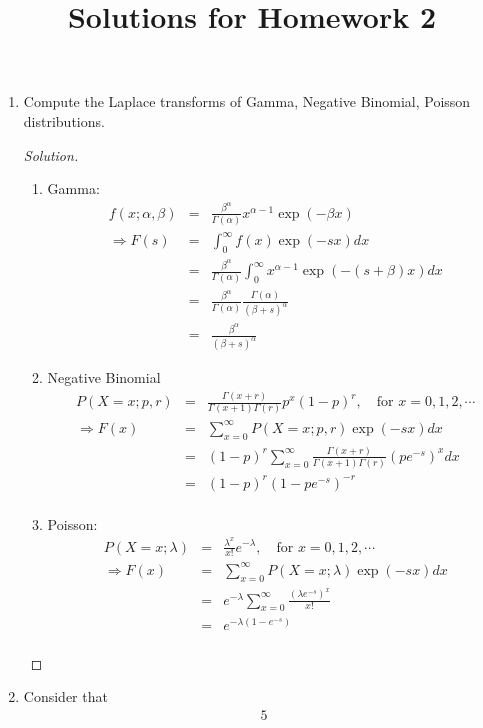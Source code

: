 \documentclass[10pt,a4paper]{article}
\title{Solutions for Homework 2}
\date{}
\begin{document}
\maketitle
\begin{enumerate}
\item Compute the Laplace transforms of Gamma, Negative Binomial, Poisson distributions.
\begin{proof}[Solution]\let\qed\relax
\begin{enumerate}
\item Gamma:
\begin{eqnarray*}
f(x; \alpha,\beta) &=& \frac{\beta^\alpha}{\Gamma(\alpha)}x^{\alpha-1}\exp(-\beta x) \\
\Longrightarrow F(s) &=& \int_0^\infty f(x)\exp(-s x) dx \\
&=& \frac{\beta^\alpha}{\Gamma(\alpha)}\int_0^\infty x^{\alpha-1}\exp(-(s+\beta)x) dx \\
&=& \frac{\beta^\alpha}{\Gamma(\alpha)}\frac{\Gamma(\alpha)}{(\beta+s)^\alpha} \\
&=& \frac{\beta^\alpha}{(\beta+s)^\alpha}
\end{eqnarray*}
\item Negative Binomial
\begin{eqnarray*}
P(X=x;p,r) &=& \frac{\Gamma(x+r)}{\Gamma(x+1)\Gamma(r)}p^x (1-p)^r, \quad \mbox{for}\,\,x = 0,1,2,\cdots \\
\Longrightarrow F(x) &=& \sum_{x=0}^\infty P(X=x;p,r)\exp(-sx) dx \\
&=& (1-p)^r\sum_{x=0}^\infty \frac{\Gamma(x+r)}{\Gamma(x+1)\Gamma(r)}(pe^{-s})^x dx \\
&=& (1-p)^r(1-pe^{-s})^{-r} \\
\end{eqnarray*}
\item Poisson:
\begin{eqnarray*}
P(X=x;\lambda) &=& \frac{\lambda^x}{x!}e^{-\lambda},\quad \mbox{for}\,\,x = 0,1,2,\cdots \\
\Longrightarrow F(x) &=& \sum_{x=0}^\infty P(X=x;\lambda)\exp(-sx) dx \\
&=& e^{-\lambda}\sum_{x=0}^\infty\frac{(\lambda e^{-s})^x}{x!} \\
&=& e^{-\lambda (1-e^{-s})} \\
\end{eqnarray*}
\end{enumerate}
\end{proof}
\item Consider that
	\begin{alignat*}{5}

\end{alignat*}
\end{enumerate}
\end{document}
